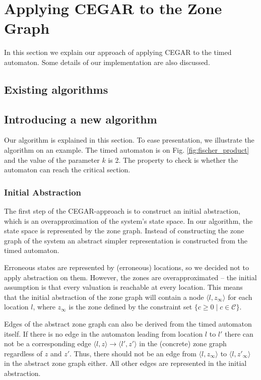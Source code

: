 \chapter{Applying CEGAR to the Zone Graph} \label{sec:timed_cegar}

In this section we explain our approach of applying CEGAR to the timed
automaton. Some details of our implementation are also
discussed.

\section{Existing algorithms}
  
\section{Introducing a new algorithm}


Our algorithm is explained in this section. To ease presentation, we illustrate
the algorithm on an example. The timed automaton is on Fig.
\ref{fig:fischer_product} and the value of the parameter $k$ is 2. The property
to check is whether the automaton can reach the critical section. 

\subsection{Initial Abstraction} The first step of the CEGAR-approach is to
construct an initial abstraction, which is an overapproximation of the system's
state space. In our algorithm, the state space is represented by the zone graph.
Instead of constructing the zone graph of the system an abstract simpler representation is constructed from the timed automaton.

Erroneous states are represented by (erroneous) locations, so we decided not to apply abstraction on them. 
However, the zones are overapproximated -- the initial assumption is
that every valuation is reachable at every location. This means that the initial
abstraction of the zone graph will contain a node $\langle l,z_\infty \rangle$
for each location $l$, where $z_\infty$ is the zone defined by the constraint set $\{c \geq 0 \mid c \in \mathcal{C}\}$.

Edges of the abstract zone graph can also be derived from the timed automaton
itself. If there is no edge in the automaton leading from location $l$ to
$l'$ there can not be a corresponding edge $\langle l,z \rangle \to \langle l',z' \rangle$ in the (concrete) zone graph regardless of $z$ and $z'$. Thus, there should not be an edge from $\langle l,z_\infty \rangle$ to $\langle l,z'_\infty
\rangle$ in the abstract zone graph either. All other edges are represented in
the initial abstraction.

